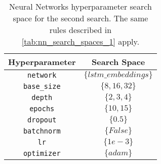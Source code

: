 \begin{table}[H]
    \centering
    \begin{tabular}{|c|c|}
        \hline

        \textbf{Hyperparameter} &
        \textbf{Search Space} \\

        \hline

        \texttt{network} &
        $\{lstm\_embeddings\}$ \\

        \hline

        \texttt{base\_size} &
        $\{8, 16, 32\}$ \\

        \hline

        \texttt{depth} &
        $\{2, 3, 4\}$ \\

        \hline

        \texttt{epochs} &
        $\{10, 15\}$ \\

        \hline

        \texttt{dropout} &
        $\{0.5\}$ \\

        \hline

        \texttt{batchnorm} &
        $\{False\}$ \\

        \hline

        \texttt{lr} &
        $\{1e-3\}$ \\

        \hline

        \texttt{optimizer} &
        $\{adam\}$ \\

        \hline
    \end{tabular}
    \caption{Neural Networks hyperparameter 
    search space for the second search. 
    The same rules described in 
    \autoref{tab:nn_search_spaces_1} apply.}
    \label{tab:nn_search_spaces_2}
\end{table}